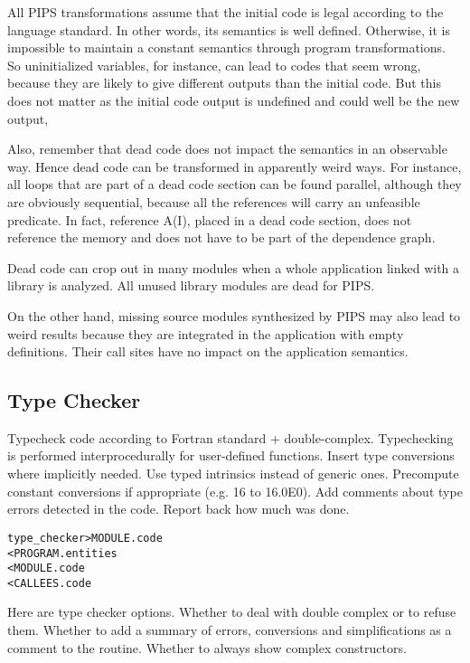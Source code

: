 \documentclass[a4paper]{report}
\newenvironment{PipsMake}{\begin{alltt}}{\end{alltt}}
\begin{document}
All PIPS transformations assume that the initial code is legal
according to the language standard. In other words, its semantics is
well defined. Otherwise, it is impossible to maintain a constant
semantics through program transformations. So uninitialized variables,
for instance, can lead to codes that seem wrong, because they are
likely to give different outputs than the initial code. But this does
not matter as the initial code output is undefined and could well be
the new output,

Also, remember that dead code does not impact the semantics in an
observable way. Hence dead code can be transformed in apparently weird
ways. For instance, all loops that are part of a dead code section can
be found parallel, although they are obviously sequential, because all
the references will carry an unfeasible predicate. In fact, reference
A(I), placed in a dead code section, does not reference the memory and
does not have to be part of the dependence graph.

Dead code can crop out in many modules when a whole application linked
with a library is analyzed. All unused library modules are dead for
PIPS.

On the other hand, missing source modules synthesized by PIPS may also
lead to weird results because they are integrated in the application
with empty definitions. Their call sites have no impact on the
application semantics.


\subsection{Type Checker}
\label{subsection-type-checker}

Typecheck code according to Fortran standard + double-complex.
Typechecking is performed interprocedurally for user-defined functions.
Insert type conversions where implicitly needed.
Use typed intrinsics instead of generic ones.
Precompute constant conversions if appropriate (e.g. 16 to 16.0E0).
Add comments about type errors detected in the code.
Report back how much was done.

\begin{PipsMake}
type_checker            > MODULE.code
        < PROGRAM.entities
        < MODULE.code
        < CALLEES.code
\end{PipsMake}

Here are type checker options. Whether to deal with double complex or to
refuse them. Whether to add a summary of errors, conversions and
simplifications as a comment to the routine. Whether to always show complex
constructors.
\end{document}
